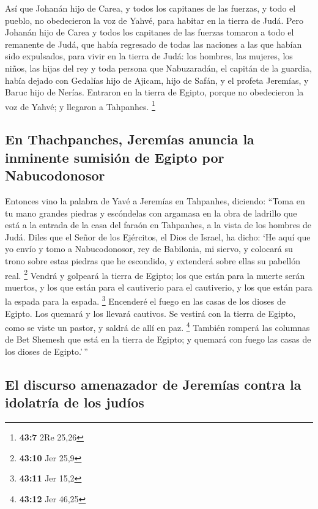  Así que Johanán hijo de Carea, y todos los capitanes de
las fuerzas, y todo el pueblo, no obedecieron la voz de Yahvé, para
habitar en la tierra de Judá.  Pero Johanán hijo de Carea
y todos los capitanes de las fuerzas tomaron a todo el remanente de
Judá, que había regresado de todas las naciones a las que habían sido
expulsados, para vivir en la tierra de Judá:  los hombres,
las mujeres, los niños, las hijas del rey y toda persona que
Nabuzaradán, el capitán de la guardia, había dejado con Gedalías hijo de
Ajicam, hijo de Safán, y el profeta Jeremías, y Baruc hijo de Nerías.
 Entraron en la tierra de Egipto, porque no obedecieron la
voz de Yahvé; y llegaron a Tahpanhes. \footnote{\textbf{43:7} 2Re 25,26}

\hypertarget{en-thachpanches-jeremuxedas-anuncia-la-inminente-sumisiuxf3n-de-egipto-por-nabucodonosor}{%
\subsection{En Thachpanches, Jeremías anuncia la inminente sumisión de
Egipto por
Nabucodonosor}\label{en-thachpanches-jeremuxedas-anuncia-la-inminente-sumisiuxf3n-de-egipto-por-nabucodonosor}}

 Entonces vino la palabra de Yavé a Jeremías en Tahpanhes,
diciendo:  ``Toma en tu mano grandes piedras y escóndelas
con argamasa en la obra de ladrillo que está a la entrada de la casa del
faraón en Tahpanhes, a la vista de los hombres de Judá. 
Diles que el Señor de los Ejércitos, el Dios de Israel, ha dicho: `He
aquí que yo envío y tomo a Nabucodonosor, rey de Babilonia, mi siervo, y
colocará su trono sobre estas piedras que he escondido, y extenderá
sobre ellas su pabellón real. \footnote{\textbf{43:10} Jer 25,9}
 Vendrá y golpeará la tierra de Egipto; los que están
para la muerte serán muertos, y los que están para el cautiverio para el
cautiverio, y los que están para la espada para la espada. \footnote{\textbf{43:11}
  Jer 15,2}  Encenderé el fuego en las casas de los
dioses de Egipto. Los quemará y los llevará cautivos. Se vestirá con la
tierra de Egipto, como se viste un pastor, y saldrá de allí en paz.
\footnote{\textbf{43:12} Jer 46,25}  También romperá las
columnas de Bet Shemesh que está en la tierra de Egipto; y quemará con
fuego las casas de los dioses de Egipto.'\,''

\hypertarget{el-discurso-amenazador-de-jeremuxedas-contra-la-idolatruxeda-de-los-juduxedos}{%
\subsection{El discurso amenazador de Jeremías contra la idolatría de
los
judíos}\label{el-discurso-amenazador-de-jeremuxedas-contra-la-idolatruxeda-de-los-juduxedos}}

